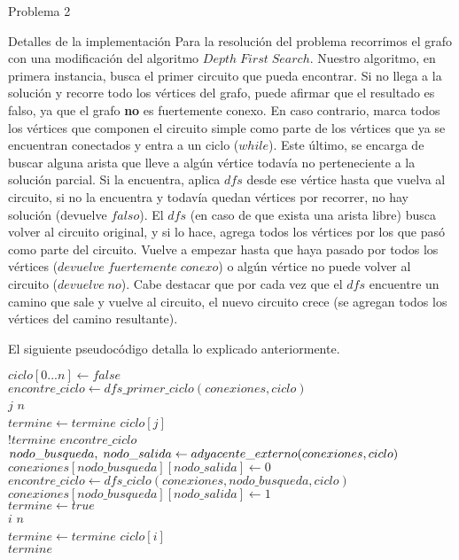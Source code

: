 \begin{section}{Problema 2}
\begin{subsection}{Detalles de la implementación}
		Para la resolución del problema recorrimos el grafo con una modificación del algoritmo $Depth\; First\; Search$. Nuestro algoritmo, en primera instancia, busca el primer circuito que pueda encontrar. Si no llega a la solución y recorre todo los vértices del grafo, puede afirmar que el resultado es falso, ya que el grafo \textbf{no} es fuertemente conexo. En caso contrario, marca todos los vértices que componen el circuito simple como parte de los vértices que ya se encuentran conectados y entra a un ciclo ($while$). Este último, se encarga de buscar alguna arista que lleve a algún vértice todavía no perteneciente a la solución parcial. Si la encuentra, aplica $dfs$ desde ese vértice hasta que vuelva al circuito, si no la encuentra y todavía quedan vértices por recorrer, no hay solución (devuelve $falso$). El $dfs$ (en caso de que exista una arista libre) busca volver al circuito original, y si lo hace, agrega todos los vértices por los que pasó como parte del circuito. Vuelve a empezar hasta que haya pasado por todos los vértices ($devuelve\; fuertemente\; conexo$) o algún vértice no puede volver al circuito ($devuelve\; no$). Cabe destacar que por cada vez que el $dfs$ encuentre un camino que sale y vuelve al circuito, el nuevo circuito crece (se agregan todos los vértices del camino resultante).\VSP

		El siguiente pseudocódigo detalla lo explicado anteriormente.\VSP

		\begin{pseudo}
		\tab $ciclo[0...n] \leftarrow false$\\
		\tab $encontre\_ciclo \leftarrow dfs\_primer\_ciclo(conexiones,ciclo)$\\
		\tab \FOR $j$ \TO $n$\\
		\tab \tab $termine \leftarrow termine$ \AND $ciclo[j]$\\
		\tab \WHILE $!termine$ \AND $encontre\_ciclo$\\
		\tab \tab $nodo\_busqueda,\;nodo\_salida \leftarrow \nolinebreak adyacente\_externo(conexiones,ciclo)$\\
		\tab \tab $conexiones[nodo\_busqueda][nodo\_salida] \leftarrow 0$\\
		\tab \tab $encontre\_ciclo \leftarrow dfs\_ciclo(conexiones,nodo\_busqueda,ciclo)$\\
		\tab \tab $conexiones[nodo\_busqueda][nodo\_salida] \leftarrow 1$\\
		\tab \tab $termine \leftarrow true$\\
		\tab \tab \FOR $i$ \TO $n$\\
		\tab \tab \tab $termine \leftarrow termine$ \AND $ciclo[i]$\\
		\tab \RET $termine$\\
		\end{pseudo}


\end{subsection}
\end{section}
